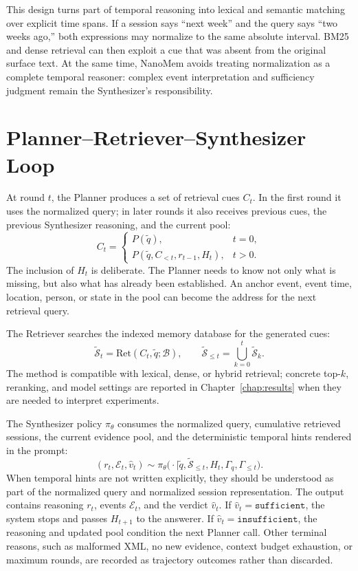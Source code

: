 This design turns part of temporal reasoning into lexical and semantic
matching over explicit time spans. If a session says ``next week'' and the query
says ``two weeks ago,'' both expressions may normalize to the same absolute
interval. BM25 and dense retrieval can then exploit a cue that was absent from
the original surface text. At the same time, NanoMem avoids treating
normalization as a complete temporal reasoner: complex event interpretation and
sufficiency judgment remain the Synthesizer's responsibility.

\section{Planner--Retriever--Synthesizer Loop}
\label{sec:methods-loop}

At round $t$, the Planner produces a set of retrieval cues $C_t$. In the first
round it uses the normalized query; in later rounds it also receives previous
cues, the previous Synthesizer reasoning, and the current pool:
\[
C_t=
\begin{cases}
P(\widetilde{q}), & t=0,\\
P(\widetilde{q},C_{<t},r_{t-1},H_t), & t>0.
\end{cases}
\label{eq:planner}
\]
The inclusion of $H_t$ is deliberate. The Planner needs to know not only what is
missing, but also what has already been established. An anchor event, event
time, location, person, or state in the pool can become the address for the next
retrieval query.

The Retriever searches the indexed memory database for the generated cues:
\[
  \widetilde{\mathcal{S}}_t
  =\mathrm{Ret}(C_t,\widetilde{q};\mathcal{B}),
  \qquad
  \widetilde{\mathcal{S}}_{\le t}
  =\bigcup_{k=0}^{t}\widetilde{\mathcal{S}}_k.
  \label{eq:retrieval}
\]
The method is compatible with lexical, dense, or hybrid retrieval; concrete
top-$k$, reranking, and model settings are reported in Chapter~\ref{chap:results}
when they are needed to interpret experiments.

The Synthesizer policy $\pi_\theta$ consumes the normalized query, cumulative
retrieved sessions, the current evidence pool, and the deterministic temporal
hints rendered in the prompt:
\[
  (r_t,\mathcal{E}_t,\hat{v}_t)
  \sim
  \pi_{\theta}
  \bigl(\cdot\mid
  \widetilde{q},\widetilde{\mathcal{S}}_{\le t},H_t,\Gamma_q,\Gamma_{\le t}
  \bigr).
  \label{eq:synthesizer}
\]
When temporal hints are not written explicitly, they should be understood as
part of the normalized query and normalized session representation. The output
contains reasoning $r_t$, events $\mathcal{E}_t$, and the verdict $\hat{v}_t$.
If $\hat{v}_t=\texttt{sufficient}$, the system stops and passes $H_{t+1}$ to
the answerer. If $\hat{v}_t=\texttt{insufficient}$, the reasoning and updated
pool condition the next Planner call. Other terminal reasons, such as malformed
XML, no new evidence, context budget exhaustion, or maximum rounds, are recorded
as trajectory outcomes rather than discarded.

